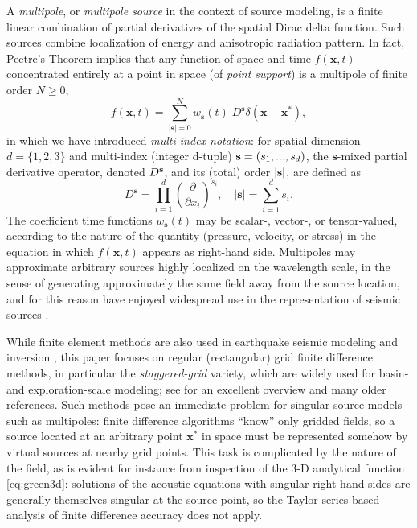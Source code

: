 A {\em multipole}, or {\em multipole source} in the 
context of source modeling, is a finite linear combination of partial 
derivatives of the spatial Dirac delta function. Such sources combine
localization of energy and anisotropic radiation pattern. In fact,
Peetre's Theorem \cite[]{Horm:69} implies that any function of space
and time $f(\mathbf x,t)$ concentrated entirely at a point in space
(of {\em point support}) is a multipole of finite order $N \ge 0$,
\begin{equation}\label{eq:MPSappx}
        f(\mathbf x,t) = \sum_{|\mathbf s|=0}^N w_{\mathbf s}(t) \; D^{\mathbf s}\delta(\mathbf x-\mathbf x^*),
\end{equation}
in which we have introduced {\em multi-index notation}: for spatial
dimension $d=\{1,2,3\}$ and multi-index (integer d-tuple) ${\bf s} =
(s_1,...,s_d)$, the $\mathbf s$-mixed partial derivative operator, denoted $D^{\bf s}$,
and its (total) order $|{\bf s}|$, are defined as
\begin{equation}\label{eq:PDO}
        D^{\mathbf s} = \prod_{i=1}^d \left( \frac{\partial}{\partial x_i}\right)^{s_i}, \quad |\mathbf s| = \sum_{i=1}^{d} s_i.
\end{equation}
The coefficient time functions $w_{\mathbf s}(t)$ may be scalar-, vector-, or
tensor-valued, according to the nature of the quantity (pressure, velocity, or stress) 
in the equation in which
$f(\mathbf x,t)$ appears as right-hand side.  Multipoles may
approximate arbitrary sources highly localized on the wavelength scale, in
the sense of generating approximately the same field away from the
source location, and for this reason have enjoyed widespread use in
the representation of seismic sources \cite[]{Shearer:2009}.

While finite element methods are also used in earthquake seismic modeling and inversion \cite[]{KomTromp:00,Cohen:01,Ghattas:IP25}, this paper focuses on regular (rectangular) grid finite difference methods, in particular the {\em staggered-grid} variety, which are widely used for basin- and exploration-scale modeling; see \cite{moczoetal:06} for an excellent overview and many older references. 
Such methods pose an immediate problem for singular source models such as multipoles: finite
difference algorithms ``know'' only gridded fields, so a source located at an arbitrary point $\mathbf x^*$ in space must be represented somehow by virtual sources at nearby grid points. 
This task is complicated by the nature of the field, as is evident for instance from inspection of the 3-D analytical function \ref{eq:green3d}: solutions of the acoustic equations with singular right-hand sides are generally themselves singular at the source point, so the Taylor-series based analysis of finite difference accuracy does not apply.

